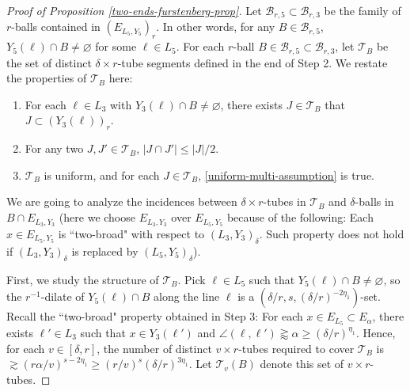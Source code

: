 \documentclass{amsart}
\numberwithin{equation}{section}
\newcommand{\al}{\alpha}
\newcommand{\de}{\delta}
\newcommand{\cb}{\mathcal B}
\newcommand{\cT}{{\mathcal T}}
\begin{document}
\begin{proof}[Proof of Proposition \ref{two-ends-furstenberg-prop}]
Let $\cb_{r,5}\subset\cb_{r,3}$ be the family of $r$-balls contained in $(E_{L_5, Y_5})_r$.
In other words, for any $B\in\cb_{r,5}$, $Y_5(\ell)\cap B\not=\varnothing$ for some $\ell\in L_5$.  
For each $r$-ball $B\in\cb_{r,5} \subset \cb_{r, 3}$, let $\cT_B$ be the set of distinct $\delta\times r$-tube segments defined in the end of Step 2.  
We restate the properties of $\cT_B$ here:
\begin{enumerate}
    \item For each $\ell \in L_3$ with $Y_3(\ell)\cap B\neq \varnothing$, there exists $J\in \cT_B$ that $J\subset (Y_3(\ell))_r$.
    \item For any two $J, J'\in \cT_B$, $|J\cap J'|\leq |J|/2$.
    \item $\cT_B$ is uniform, and for each $J\in\cT_B$, \eqref{uniform-multi-assumption} is true.
\end{enumerate}
We are going to analyze the incidences between $\delta\times r$-tubes in $\cT_B$ and $\delta$-balls in $B\cap E_{L_3, Y_3}$ (here we choose $E_{L_3, Y_3}$ over $E_{L_5, Y_5}$ because of the following: Each $x\in E_{L_5, Y_5}$ is ``two-broad" with respect to $(L_3,Y_3)_\de$. 
Such property does not hold if $(L_3,Y_3)_\de$ is replaced by $(L_5,Y_5)_\de$).  


\smallskip
First, we study the structure of $\cT_B$. 
Pick $\ell\in L_5$ such that $Y_5(\ell)\cap B\not=\varnothing$, so the $r^{-1}$-dilate of $ Y_5(\ell)\cap B$ along the line $\ell$ is a $(\de/r, s, (\de/r)^{-2\eta_1})$-set. 
Recall the ``two-broad" property obtained in Step 3: 
For each $x\in E_{L_5} \subset E_{\al}$, there exists $\ell'\in L_3$ such that $ x\in Y_3(\ell')$ and $\angle (\ell, \ell')\gtrapprox \al\geq(\de/r)^{\eta_1} $.
Hence, for each $v\in[\de,r]$, the number of distinct $v\times r$-tubes required to cover $\cT_B$ is $\gtrsim (r\al/v)^{s-2\eta_1}\geq (r/v)^{s}(\de/r)^{3\eta_1}$. 
Let $\cT_v(B)$ denote this set of $v\times r$-tubes. 



\end{proof}
\end{document}
